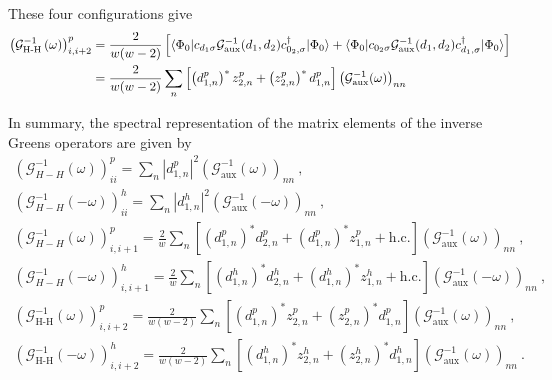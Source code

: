 \documentclass[10pt]{report}
\numberwithin{equation}{section}
\begin{document}
These four configurations give
\begin{equation}\begin{aligned}
	\left(\mathcal{G}_\text{H-H}^{-1}\left( \omega \right) \right)^p_{i,i+2} &= \frac{2}{w(w-2)}\left[\braket{\Phi_0|c_{d_1\sigma}\mathcal{G}^{-1}_\text{aux}(d_1,d_2)c^\dagger_{0_2,\sigma}|\Phi_0} + \braket{\Phi_0|c_{0_2\sigma}\mathcal{G}^{-1}_\text{aux}(d_1,d_2)c^\dagger_{d_1,\sigma}|\Phi_0}\right] \\
										 &= \frac{2}{w(w-2)}\sum_n \left[\left(d^p_{1,n}\right)^* z^p_{2,n} + \left(z^p_{2,n}\right)^* d^p_{1,n}\right] \left(\mathcal{G}^{-1}_\text{aux}(\omega)\right)_{nn}
\end{aligned}\end{equation}


In summary, the spectral representation of the matrix elements of the inverse Greens operators are given by
\begin{gather}
\label{green_eq_final_siam}
	\left(\mathcal{G}^{-1}_{H-H}(\omega)\right)^p_{ii} = \sum_{n} |d^p_{1,n}|^2 \left(\mathcal{G}^{-1}_\text{aux}(\omega)\right)_{nn}~,\\
	\left(\mathcal{G}^{-1}_{H-H}(-\omega)\right)^h_{ii} = \sum_{n} |d^h_{1,n}|^2 \left(\mathcal{G}^{-1}_\text{aux}(-\omega)\right)_{nn}~,\\
	\left(\mathcal{G}^{-1}_{H-H}\left(\omega\right) \right)^p_{i,i+1} = \frac{2}{w} \sum_n \left[\left(d^p_{1,n}\right)^*d^p_{2,n} + \left(d^p_{1,n}\right)^* z^p_{1,n} + \text{h.c.}\right] \left(\mathcal{G}^{-1}_\text{aux}(\omega) \right)_{nn}~,\\
	\left(\mathcal{G}^{-1}_{H-H}\left(-\omega\right) \right)^h_{i,i+1} = \frac{2}{w} \sum_n \left[\left(d^h_{1,n}\right)^*d^h_{2,n} + \left(d^h_{1,n}\right)^* z^h_{1,n} + \text{h.c.}\right] \left(\mathcal{G}^{-1}_\text{aux}(-\omega) \right)_{nn}~,\\
	\left(\mathcal{G}_\text{H-H}^{-1}\left( \omega \right) \right)^p_{i,i+2} = \frac{2}{w(w-2)}\sum_n \left[\left(d^p_{1,n}\right)^* z^p_{2,n} + \left(z^p_{2,n}\right)^* d^p_{1,n}\right] \left(\mathcal{G}^{-1}_\text{aux}(\omega)\right)_{nn}~,\\
	\left(\mathcal{G}_\text{H-H}^{-1}\left( -\omega \right) \right)^h_{i,i+2} = \frac{2}{w(w-2)}\sum_n \left[\left(d^h_{1,n}\right)^* z^h_{2,n} + \left(z^h_{2,n}\right)^* d^h_{1,n}\right] \left(\mathcal{G}^{-1}_\text{aux}(\omega)\right)_{nn}~.
\end{gather}
\end{document}
